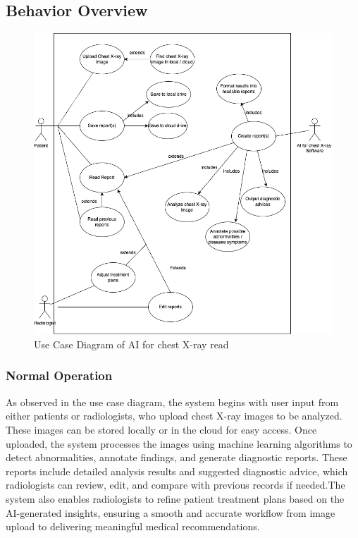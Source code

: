 \documentclass[12pt]{article}
\begin{document}
\subsection{Behavior Overview}
\begin{figure}[H] 
  \centering
  \includegraphics[width=1\linewidth]{UseCase.png}
  \caption{Use Case Diagram of AI for chest X-ray read}
  \label{fig:use-case-diagram}
\end{figure}
\vspace{-5em} 
\newpage
\subsubsection{Normal Operation}
As observed in the use case diagram, the system begins with user input from either patients or radiologists, who upload chest X-ray images to be analyzed. These images can be stored locally or in the cloud for easy access. Once uploaded, the system processes the images using machine learning algorithms to detect abnormalities, annotate findings, and generate diagnostic reports. These reports include detailed analysis results and suggested diagnostic advice, which radiologists can review, edit, and compare with previous records if needed.The system also enables radiologists to refine patient treatment plans based on the AI-generated insights, ensuring a smooth and accurate workflow from image upload to delivering meaningful medical recommendations.
\end{document}
